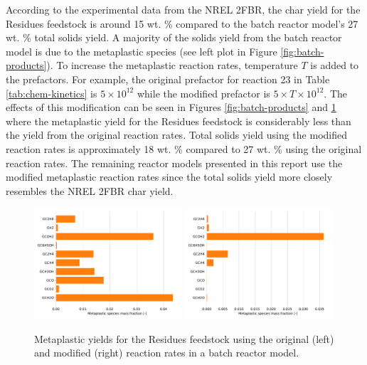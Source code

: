 According to the experimental data from the NREL 2FBR, the char yield for the Residues feedstock is around 15 wt. \% compared to the batch reactor model's 27 wt. \% total solids yield. A majority of the solids yield from the batch reactor model is due to the metaplastic species (see left plot in Figure \ref{fig:batch-products}). To increase the metaplastic reaction rates, temperature $T$ is added to the prefactors. For example, the original prefactor for reaction 23 in Table \ref{tab:chem-kinetics} is $5 \times 10^{12}$ while the modified prefactor is $5 \times T \times 10^{12}$. The effects of this modification can be seen in Figures \ref{fig:batch-products} and \ref{fig:metaplastic} where the metaplastic yield for the Residues feedstock is considerably less than the yield from the original reaction rates. Total solids yield using the modified reaction rates is approximately 18 wt. \% compared to 27 wt. \% using the original reaction rates. The remaining reactor models presented in this report use the modified metaplastic reaction rates since the total solids yield more closely resembles the NREL 2FBR char yield.

\begin{figure}[H]
    \centering
    \includegraphics[width=0.49\textwidth]{figures/metaplastic1.pdf}
    \includegraphics[width=0.49\textwidth]{figures/metaplastic2.pdf}
    \caption{Metaplastic yields for the Residues feedstock using the original (left) and modified (right) reaction rates in a batch reactor model.}
    \label{fig:metaplastic}
\end{figure}

